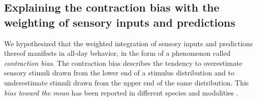 \documentclass[10pt,a4paper]{article}
\begin{document}
\subsection*{Explaining the contraction bias with the weighting of sensory inputs and predictions}
% 
We hypothesized that the weighted integration of sensory inputs and predictions thereof manifests in all-day behavior, in the form of a phenomenon called \textit{contraction bias}. The contraction bias describes the tendency to overestimate sensory stimuli drawn from the lower end of a stimulus distribution and to underestimate stimuli drawn from the upper end of the same distribution. This \textit{bias toward the mean} has been reported in different species and modalities \citep{hollingworth1910central, jazayeri2010temporal, ashourian2011bayesian, petzschner2011iterative, akrami2018posterior, meirhaeghe2021precise}. 
%
\end{document}

